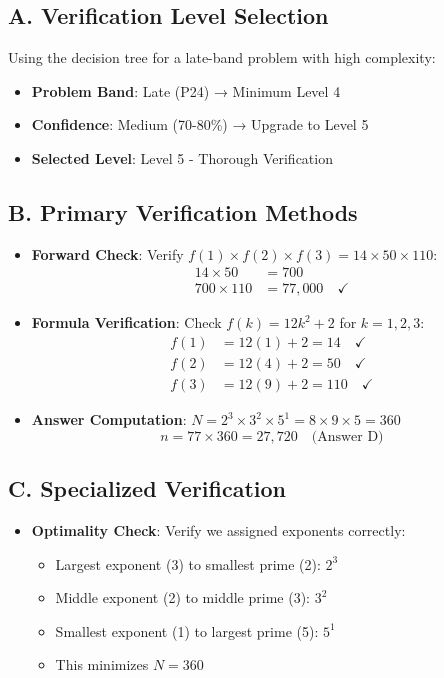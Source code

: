 \documentclass[11pt]{article}
\begin{document}
\begin{verificationbox}
\subsection*{A. Verification Level Selection}
Using the decision tree for a late-band problem with high complexity:
\begin{itemize}[leftmargin=*]
    \item \textbf{Problem Band}: Late (P24) → Minimum Level 4
    \item \textbf{Confidence}: Medium (70-80\%) → Upgrade to Level 5
    \item \textbf{Selected Level}: Level 5 - Thorough Verification
\end{itemize}

\subsection*{B. Primary Verification Methods}
\begin{itemize}[leftmargin=*]
    \item \textbf{Forward Check}: Verify $f(1) \times f(2) \times f(3) = 14 \times 50 \times 110$:
    \begin{align*}
        14 \times 50 &= 700 \\
        700 \times 110 &= 77,000 \quad \checkmark
    \end{align*}
    
    \item \textbf{Formula Verification}: Check $f(k) = 12k^2 + 2$ for $k=1,2,3$:
    \begin{align*}
        f(1) &= 12(1) + 2 = 14 \quad \checkmark \\
        f(2) &= 12(4) + 2 = 50 \quad \checkmark \\
        f(3) &= 12(9) + 2 = 110 \quad \checkmark
    \end{align*}
    
    \item \textbf{Answer Computation}: $N = 2^3 \times 3^2 \times 5^1 = 8 \times 9 \times 5 = 360$
    \[n = 77 \times 360 = 27,720 \quad \text{(Answer D)}\]
\end{itemize}

\subsection*{C. Specialized Verification}
\begin{itemize}[leftmargin=*]
    \item \textbf{Optimality Check}: Verify we assigned exponents correctly:
    \begin{itemize}
        \item Largest exponent (3) to smallest prime (2): $2^3$
        \item Middle exponent (2) to middle prime (3): $3^2$
        \item Smallest exponent (1) to largest prime (5): $5^1$
        \item This minimizes $N = 360$
    \end{itemize}
    

\end{itemize}
\end{verificationbox}
\end{document}
